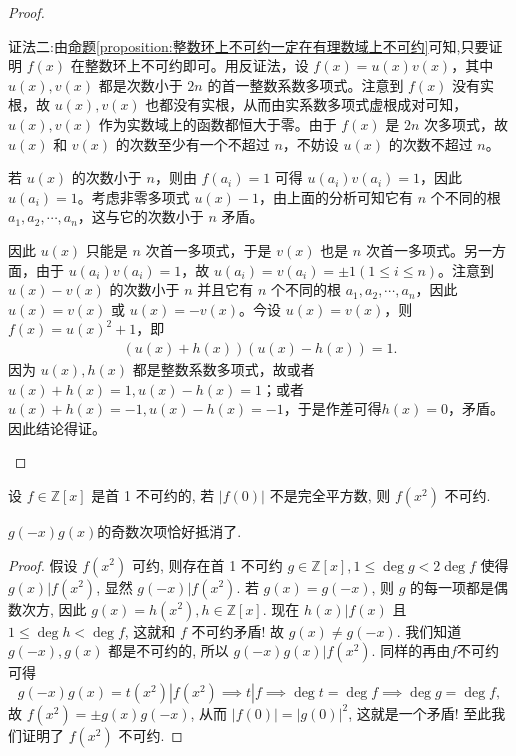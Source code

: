 \documentclass[../../main.tex]{subfiles}
\begin{document}
\begin{proof}
\begin{enumerate}
{\color{blue}证法二:}由\hyperref[proposition:整数环上不可约一定在有理数域上不可约]{命题\ref{proposition:整数环上不可约一定在有理数域上不可约}}可知,只要证明 $f(x)$ 在整数环上不可约即可。用反证法，设 $f(x) = u(x)v(x)$，其中 $u(x), v(x)$ 都是次数小于 $2n$ 的首一整数系数多项式。注意到 $f(x)$ 没有实根，故
$u(x), v(x)$
也都没有实根，从而由实系数多项式虚根成对可知，$u(x), v(x)$ 作为实数域上的函数都恒大于零。由于 $f(x)$ 是 $2n$ 次多项式，故 $u(x)$ 和 $v(x)$ 的次数至少有一个不超过 $n$，不妨设 $u(x)$ 的次数不超过 $n$。

若 $u(x)$ 的次数小于 $n$，则由 $f(a_i) = 1$ 可得 $u(a_i)v(a_i) = 1$，因此 $u(a_i) = 1$。考虑非零多项式 $u(x) - 1$，由上面的分析可知它有 $n$ 个不同的根 $a_1, a_2, \cdots, a_n$，这与它的次数小于 $n$ 矛盾。

因此 $u(x)$ 只能是 $n$ 次首一多项式，于是 $v(x)$ 也是 $n$ 次首一多项式。另一方面，由于 $u(a_i)v(a_i) = 1$，故 $u(a_i) = v(a_i) = \pm 1 (1 \leqslant  i \leqslant  n)$。注意到 $u(x) - v(x)$ 的次数小于 $n$ 并且它有 $n$ 个不同的根 $a_1, a_2, \cdots, a_n$，因此 $u(x) = v(x)$ 或 $u(x) = -v(x)$。今设 $u(x) = v(x)$，则 $f(x) = u(x)^2 + 1$，即
\begin{align*}
(u(x) + h(x))(u(x) - h(x)) = 1.
\end{align*}
因为 $u(x), h(x)$ 都是整数系数多项式，故或者 $u(x) + h(x) = 1, u(x) - h(x) = 1$；或者 $u(x) + h(x) = -1, u(x) - h(x) = -1$，于是作差可得$h(x) = 0$，矛盾。因此结论得证。
\end{enumerate}

\end{proof}

\begin{example}\label{example:不可约多项式证明例题11}
设 \( f \in \mathbb{Z}[x] \) 是首 1 不可约的, 若 \( |f(0)| \) 不是完全平方数, 则 \( f(x^2) \) 不可约.
\end{example}
\begin{remark}
$g(-x)g(x)$的奇数次项恰好抵消了.
\end{remark}
\begin{proof}
假设 \( f(x^2) \) 可约, 则存在首 1 不可约 \( g \in \mathbb{Z}[x], 1 \leqslant \deg g < 2\deg f \) 使得 \( g(x)|f(x^2) \), 显然 \( g(-x)|f(x^2) \). 若 \( g(x) = g(-x) \), 则 \( g \) 的每一项都是偶数次方, 因此 \( g(x) = h(x^2), h \in \mathbb{Z}[x] \). 现在 \( h(x)|f(x) \) 且 \( 1 \leqslant \deg h < \deg f \), 这就和 \( f \) 不可约矛盾! 故 \( g(x) \neq g(-x) \). 我们知道 \( g(-x), g(x) \) 都是不可约的, 所以 \( g(-x)g(x)|f(x^2) \). 同样的再由$f$不可约可得
\[
g(-x)g(x) = t(x^2)|f(x^2) \implies t|f \implies \deg t = \deg f \implies \deg g = \deg f,
\]
故 \( f(x^2) = \pm g(x)g(-x) \), 从而 \( |f(0)| = |g(0)|^2 \), 这就是一个矛盾! 至此我们证明了 \( f(x^2) \) 不可约.

\end{proof}
\end{document}
